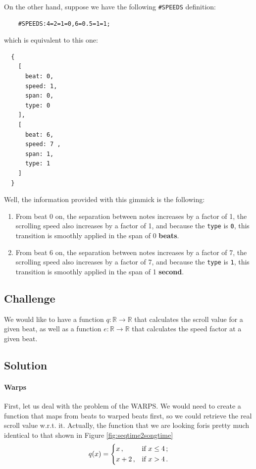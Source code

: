 \documentclass[a4paper,9pt]{article}
\begin{document}
    On the other hand, suppose we have the following \texttt{\#SPEEDS} definition:
    \begin{verbatim}
    #SPEEDS:4=2=1=0,6=0.5=1=1;     
    \end{verbatim}
    which is equivalent to this one:
    \begin{verbatim}
  {
    [
      beat: 0,
      speed: 1,
      span: 0,
      type: 0
    ],
    [
      beat: 6,
      speed: 7 ,
      span: 1,
      type: 1
    ]
  }
    \end{verbatim}
 
    Well, the information provided with this gimmick is the following:
    \begin{enumerate}
	    \item From beat 0 on, the separation between notes increases by a factor of 1, the scrolling speed also increases by a factor of 1, and because the \texttt{type} is \texttt{0},  this transition is smoothly applied in the span of 0 \textbf{beats}.
	    \item From beat 6 on, the separation between notes increases by a factor of 7, the scrolling speed also increases by a factor of 7, and because the \texttt{type} is \texttt{1}, this transition is smoothly applied in the span of 1 \textbf{second}.
    \end{enumerate}

    \subsection{Challenge}

    We would like to have a function $ q: \mathbb{R}\rightarrow \mathbb{R} $ that calculates the scroll value for a given beat, as well as a function $ e: \mathbb{R}\rightarrow \mathbb{R} $ that calculates the speed factor at a given beat.

    \subsection{Solution}

    \paragraph{Warps}
    First, let us deal with the problem of the WARPS. We would need to create a function that maps from beats to warped beats first, so we could retrieve the real scroll value w.r.t. it.
    Actually, the function that we are looking foris pretty much identical to that shown in Figure \ref{fig:seqtime2songtime}
    \begin{equation}
	    q(x) = \begin{dcases}
		    x\,, &\text{if $ x \leq 4 $}\,;\\
		    x + 2\,, &\text{if $ x > 4 $}\,.\\
	    \end{dcases}
	    \label{eq:warps-example}
    \end{equation}
\end{document}
